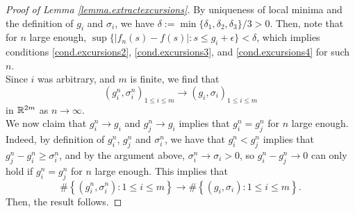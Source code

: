 \begin{proof}[Proof of Lemma \ref{lemma.extractexcursions}]
By uniqueness of local minima and the definition of $g_i$ and $\sigma_i$, we have $\delta:=\min\{\delta_1,\delta_2,\delta_3\}/3>0$. Then, note that for $n$ large enough, $\sup\{|f_n(s)-f(s)|:s\leq g_i+\epsilon\}<\delta$, which implies conditions \ref{cond.excursions2}, \ref{cond.excursions3}, and \ref{cond.excursions4} for such $n$. \\
Since $i$ was arbitrary, and $m$ is finite, we find that $$(g_i^n,\sigma_i^n)_{1\leq i\leq m}\to (g_i,\sigma_i)_{1\leq i\leq m}$$
in ${\mathbb R}^{2m}$ as $n\to \infty$. \\
We now claim that $g_i^n\to g_i$ and $g_j^n\to g_i$ implies that $g_i^n=g_j^n$ for $n$ large enough. Indeed, by definition of $g_i^n$, $g_j^n$ and $\sigma_i^n$, we have that $g_i^n<g_j^n$ implies that $g_j^n-g_i^n\geq \sigma_i^n$, and by the argument above, $\sigma_i^n\to \sigma_i>0$, so $g_i^n-g_j^n\to 0$ can only hold if $g_i^n=g_j^n$ for $n$ large enough. This implies that 
$$\#\left\{(g_i^n,\sigma_i^n):1\leq i \leq m\right\}\to \#\left\{(g_i,\sigma_i):1\leq i \leq m\right\}.$$
Then, the result follows.
\end{proof}